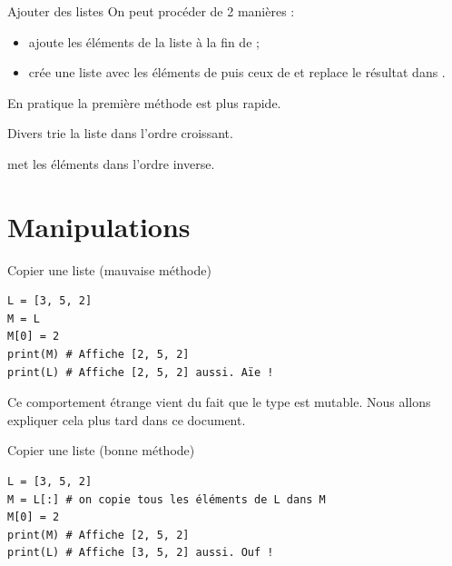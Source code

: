 \documentclass[10pt]{beamer}
\begin{document}
\begin{frame}[fragile]{Ajouter des listes}\pause
On peut procéder de 2 manières : \pause
\begin{itemize}
\item {} ajoute les éléments de la liste  à la fin de ;\pause
\item {} crée une liste avec les éléments de  puis ceux de  et replace le résultat dans .\pause
\end{itemize}
En pratique la première méthode est plus rapide.\\
\end{frame}

\begin{frame}{Divers}\pause
{} trie la liste dans l'ordre croissant.\\\pause

 met les éléments dans l'ordre inverse.\pause
\end{frame}
\section{Manipulations}
\begin{frame}[fragile]{Copier une liste (mauvaise méthode)}\pause
\begin{verbatim}
L = [3, 5, 2]
M = L
M[0] = 2
print(M) # Affiche [2, 5, 2]
print(L) # Affiche [2, 5, 2] aussi. Aïe !
\end{verbatim}
\pause
Ce comportement \og étrange\fg{} vient du fait que le type  est mutable. Nous allons expliquer cela plus tard dans ce document.
\end{frame}

\begin{frame}[fragile]{Copier une liste (bonne méthode)}\pause
\begin{verbatim}
L = [3, 5, 2]
M = L[:] # on copie tous les éléments de L dans M
M[0] = 2
print(M) # Affiche [2, 5, 2]
print(L) # Affiche [3, 5, 2] aussi. Ouf !
\end{verbatim}
\end{frame}
\end{document}
